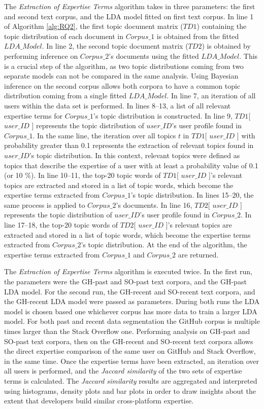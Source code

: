         The \emph{Extraction of Expertise Terms} algorithm takes in three parameters: the first and second text corpus, and the LDA model fitted on first text corpus. In line 1 of Algorithm \ref{alg:RQ2}, the first topic document matrix ($TD1$) containing the topic distribution of each document in $Corpus\_1$ is obtained from the fitted $LDA\_Model$. In line 2, the second topic document matrix ($TD2$) is obtained by performing inference on $Corpus\_2$'s documents using the fitted $LDA\_Model$. This is a crucial step of the algorithm, as two topic distributions coming from two separate models can not be compared in the same analysis. Using Bayesian inference on the second corpus allows both corpora to have a common topic distribution coming from a single fitted $LDA\_Model$. In line 7, an iteration of all users within the data set is performed. In lines 8--13, a list of all relevant expertise terms for $Corpus\_1$'s topic distribution is constructed. In line 9,  $TD1$[ $user\_ID$ ] represents the topic distribution of $user\_ID$'s user profile found in $Corpus\_1$. In the same line, the iteration over all topics $t$ in $TD1$[ $user\_ID$ ] with probability greater than 0.1 represents the extraction of relevant topics found in $user\_ID$'s topic distribution. In this context, relevant topics were defined as topics that describe the expertise of a user with at least a probability value of 0.1 (or 10 \%). In line 10--11, the top-20 topic words of $TD1$[ $user\_ID$ ]'s relevant topics are extracted and stored in a list of topic words, which become the expertise terms extracted from $Corpus\_1$'s topic distribution. In lines 15--20, the same process is applied to $Corpus\_2$'s documents. In line 16,  $TD2$[ $user\_ID$ ] represents the topic distribution of $user\_ID$'s user profile found in $Corpus\_2$. In line 17--18, the top-20 topic words of $TD2$[ $user\_ID$ ]'s relevant topics are extracted and stored in a list of topic words, which become the expertise terms extracted from $Corpus\_2$'s topic distribution. At the end of the algorithm, the expertise terms extracted from $Corpus\_1$ and $Corpus\_2$ are returned.
        
        The \emph{Extraction of Expertise Terms} algorithm is executed twice. In the first run, the parameters were the GH-past and SO-past text corpora, and the GH-past LDA model. For the second run, the GH-recent and SO-recent text corpora, and the GH-recent LDA model were passed as parameters. During both runs the LDA model is chosen based one whichever corpus has more data to train a larger LDA model. For both past and recent data segmentation the GitHub corpus is multiple times larger than the Stack Overflow one. Performing analysis on GH-past and SO-past text corpora, then on the GH-recent and SO-recent text corpora allows the direct expertise comparison of the same user on GitHub and Stack Overflow, in the same time. Once the expertise terms have been extracted, an iteration over all users is performed, and the \emph{Jaccard similarity} of the two sets of expertise terms is calculated. The \emph{Jaccard similarity} results are aggregated and interpreted using histograms, density plots and bar plots in order to draw insights about the extent that developers build similar cross-platform expertise.
    
